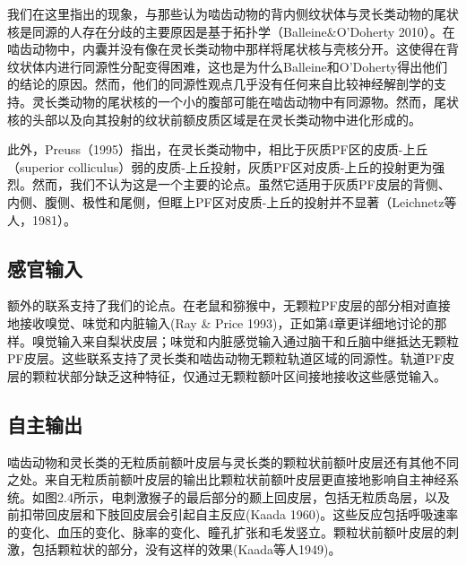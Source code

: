 我们在这里指出的现象，与那些认为啮齿动物的背内侧纹状体与灵长类动物的尾状核是同源的人存在分歧的主要原因是基于拓扑学（Balleine\&O'Doherty 2010）。在啮齿动物中，内囊并没有像在灵长类动物中那样将尾状核与壳核分开。这使得在背纹状体内进行同源性分配变得困难，这也是为什么Balleine和O'Doherty得出他们的结论的原因。然而，他们的同源性观点几乎没有任何来自比较神经解剖学的支持。灵长类动物的尾状核的一个小的腹部可能在啮齿动物中有同源物。然而，尾状核的头部以及向其投射的纹状前额皮质区域是在灵长类动物中进化形成的。

此外，Preuss（1995）指出，在灵长类动物中，相比于灰质PF区的皮质-上丘（superior colliculus）弱的皮质-上丘投射，灰质PF区对皮质-上丘的投射更为强烈。然而，我们不认为这是一个主要的论点。虽然它适用于灰质PF皮层的背侧、内侧、腹侧、极性和尾侧，但眶上PF区对皮质-上丘的投射并不显著（Leichnetz等人，1981）。

\subsection{感官输入}
额外的联系支持了我们的论点。在老鼠和猕猴中，无颗粒PF皮层的部分相对直接地接收嗅觉、味觉和内脏输入(Ray \& Price 1993)，正如第4章更详细地讨论的那样。嗅觉输入来自梨状皮层；味觉和内脏感觉输入通过脑干和丘脑中继抵达无颗粒PF皮层。这些联系支持了灵长类和啮齿动物无颗粒轨道区域的同源性。轨道PF皮层的颗粒状部分缺乏这种特征，仅通过无颗粒额叶区间接地接收这些感觉输入。

\subsection{自主输出}
啮齿动物和灵长类的无粒质前额叶皮层与灵长类的颗粒状前额叶皮层还有其他不同之处。来自无粒质前额叶皮层的输出比颗粒状前额叶皮层更直接地影响自主神经系统。如图2.4所示，电刺激猴子的最后部分的颞上回皮层，包括无粒质岛层，以及前扣带回皮层和下肢回皮层会引起自主反应(Kaada 1960)。这些反应包括呼吸速率的变化、血压的变化、脉率的变化、瞳孔扩张和毛发竖立。颗粒状前额叶皮层的刺激，包括颗粒状的部分，没有这样的效果(Kaada等人1949)。


